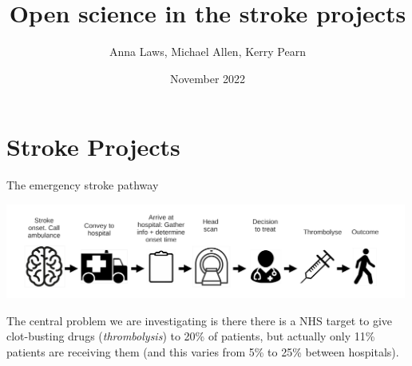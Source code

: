 \documentclass[xcolor={usenames,dvipsnames}]{beamer}
\title{Open science in the stroke projects}
\author{Anna Laws, Michael Allen, Kerry Pearn}
\date{November 2022}
\begin{document}

\begin{frame}
\titlepage

\end{frame}


\section{Stroke Projects}

\begin{frame}{The emergency stroke pathway}

\begin{center}
\includegraphics[width=0.99\textwidth]{./images/pathway}
\end{center}

\vspace{4mm}
The central problem we are investigating is there there is a NHS target to give clot-busting drugs (\emph{thrombolysis}) to 20\% of patients, but actually only 11\% patients are receiving them (and this varies from 5\% to 25\% between hospitals).

\end{frame}


\end{document}
